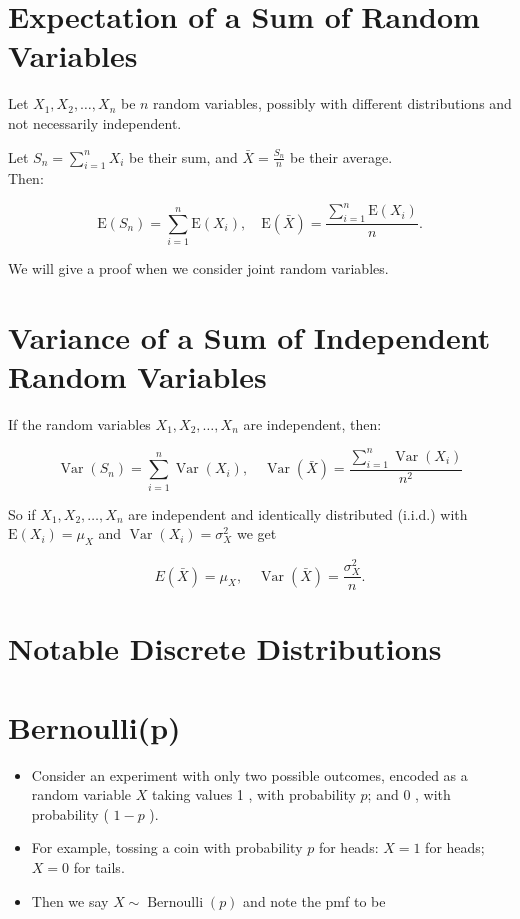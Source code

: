 \documentclass[10pt]{article}
\begin{document}
\section*{Expectation of a Sum of Random Variables}
Let $X_{1}, X_{2}, \ldots, X_{n}$ be $n$ random variables, possibly with different distributions and not necessarily independent.

Let $S_{n}=\sum_{i=1}^{n} X_{i}$ be their sum, and $\bar{X}=\frac{S_{n}}{n}$ be their average.\\
Then:

$$
\mathrm{E}\left(S_{n}\right)=\sum_{i=1}^{n} \mathrm{E}\left(X_{i}\right), \quad \mathrm{E}(\bar{X})=\frac{\sum_{i=1}^{n} \mathrm{E}\left(X_{i}\right)}{n} .
$$

We will give a proof when we consider joint random variables.

\section*{Variance of a Sum of Independent Random Variables}
If the random variables $X_{1}, X_{2}, \ldots, X_{n}$ are independent, then:

$$
\operatorname{Var}\left(S_{n}\right)=\sum_{i=1}^{n} \operatorname{Var}\left(X_{i}\right), \quad \operatorname{Var}(\bar{X})=\frac{\sum_{i=1}^{n} \operatorname{Var}\left(X_{i}\right)}{n^{2}}
$$

So if $X_{1}, X_{2}, \ldots, X_{n}$ are independent and identically distributed (i.i.d.) with $\mathrm{E}\left(X_{i}\right)=\mu_{X}$ and $\operatorname{Var}\left(X_{i}\right)=\sigma_{X}^{2}$ we get

$$
E(\bar{X})=\mu_{X}, \quad \operatorname{Var}(\bar{X})=\frac{\sigma_{X}^{2}}{n} .
$$

\section*{Notable Discrete Distributions}
\section*{Bernoulli(p)}
\begin{itemize}
  \item Consider an experiment with only two possible outcomes, encoded as a random variable $X$ taking values 1 , with probability $p$; and 0 , with probability ( $1-p$ ).
  \item For example, tossing a coin with probability $p$ for heads: $X=1$ for heads; $X=0$ for tails.
  \item Then we say $X \sim \operatorname{Bernoulli}(p)$ and note the pmf to be
\end{itemize}
\end{document}
